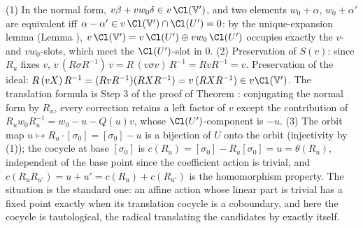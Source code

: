 (1) In the normal form, $v\beta + vw_0\delta \in v\,\Cl(\mathbb{V}')$, and two elements $w_0 + \alpha$, $w_0 + \alpha'$ are equivalent iff $\alpha - \alpha' \in v\,\Cl(\mathbb{V}') \cap \Cl(U') = 0$: by the unique-expansion lemma (Lemma ), $v\,\Cl(\mathbb{V}') = v\,\Cl(U') \oplus vw_0\,\Cl(U')$ occupies exactly the $v$- and $vw_0$-slots, which meet the $\Cl(U')$-slot in $0$. (2) Preservation of $S(v)$: since $R_u$ fixes $v$, $v\,(R\sigma R^{-1})\,v = R\,(v\sigma v)\,R^{-1} = RvR^{-1} = v$. Preservation of the ideal: $R\,(vX)\,R^{-1} = (RvR^{-1})(RXR^{-1}) = v\,(RXR^{-1}) \in v\Cl(\mathbb{V}')$. The translation formula is Step 3 of the proof of Theorem : conjugating the normal form by $R_u$, every correction retains a left factor of $v$ except the contribution of $R_u w_0 R_u^{-1} = w_0 - u - Q(u)v$, whose $\Cl(U')$-component is $-u$. (3) The orbit map $u \mapsto R_u \cdot [\sigma_0] = [\sigma_0] - u$ is a bijection of $U$ onto the orbit (injectivity by (1)); the cocycle at base $[\sigma_0]$ is $c(R_u) = [\sigma_0] - R_u[\sigma_0] = u = \theta(R_u)$, independent of the base point since the coefficient action is trivial, and $c(R_uR_{u'}) = u + u' = c(R_u) + c(R_{u'})$ is the homomorphism property. The situation is the standard one: an affine action whose linear part is trivial has a fixed point exactly when its translation cocycle is a coboundary, and here the cocycle is tautological, the radical translating the candidates by exactly itself.
